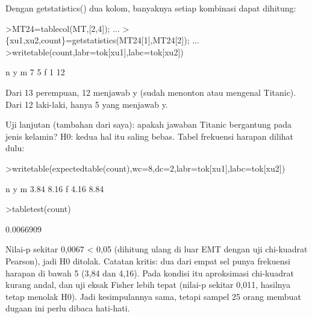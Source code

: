 \documentclass[a4paper,10pt]{article}
\begin{document}
\begin{eulernotebook}
\begin{eulercomment}
\begin{eulercomment}
\begin{eulercomment}
\begin{eulercomment}
\begin{eulercomment}
\begin{eulercomment}
\begin{eulercomment}
\begin{eulercomment}
\begin{eulercomment}
Dengan getstatistics() dua kolom, banyaknya setiap kombinasi dapat dihitung:
\end{eulercomment}
\begin{eulerprompt}
>MT24=tablecol(MT,[2,4]); ...
>\{xu1,xu2,count\}=getstatistics(MT24[1],MT24[2]); ...
>writetable(count,labr=tok[xu1],labc=tok[xu2])
\end{eulerprompt}
\begin{euleroutput}
                     n         y
           m         7         5
           f         1        12
\end{euleroutput}
\begin{eulercomment}
Dari 13 perempuan, 12 menjawab y (sudah menonton atau mengenal Titanic). Dari 12
laki-laki, hanya 5 yang menjawab y.

Uji lanjutan (tambahan dari saya): apakah jawaban Titanic bergantung pada jenis kelamin?
H0: kedua hal itu saling bebas. Tabel frekuensi harapan dilihat dulu:
\end{eulercomment}
\begin{eulerprompt}
>writetable(expectedtable(count),wc=8,dc=2,labr=tok[xu1],labc=tok[xu2])
\end{eulerprompt}
\begin{euleroutput}
                 n       y
         m    3.84    8.16
         f    4.16    8.84
\end{euleroutput}
\begin{eulerprompt}
>tabletest(count)
\end{eulerprompt}
\begin{euleroutput}
  0.0066909
\end{euleroutput}
\begin{eulercomment}
Nilai-p sekitar 0,0067 \textless{} 0,05 (dihitung ulang di luar EMT dengan uji chi-kuadrat
Pearson), jadi H0 ditolak. Catatan kritis: dua dari empat sel punya frekuensi harapan
di bawah 5 (3,84 dan 4,16). Pada kondisi itu aproksimasi chi-kuadrat kurang andal, dan
uji eksak Fisher lebih tepat (nilai-p sekitar 0,011, hasilnya tetap menolak H0). Jadi
kesimpulannya sama, tetapi sampel 25 orang membuat dugaan ini perlu dibaca hati-hati.


\end{eulercomment}
\end{eulercomment}
\end{eulercomment}
\end{eulercomment}
\end{eulercomment}
\end{eulercomment}
\end{eulercomment}
\end{eulercomment}
\end{eulercomment}
\end{eulernotebook}
\end{document}
